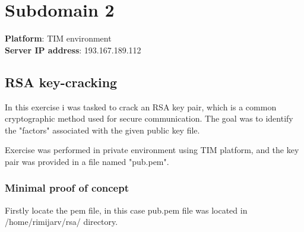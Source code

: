 \newpage

\section{Subdomain 2}
\textbf{Platform}: TIM environment\\
\textbf{Server IP address}: 193.167.189.112

\subsection{RSA key-cracking} \label{ss: issue-2}
In this exercise i was tasked to crack an RSA key pair, which is a common cryptographic method used for secure communication.
The goal was to identify the "factors" associated with the given public key file.

Exercise was performed in private environment using TIM platform, and the key pair was provided in a 
file named "pub.pem".

\subsubsection{Minimal proof of concept}
Firstly locate the pem file, in this case pub.pem file was located in /home/rimijarv/rsa/ directory.

